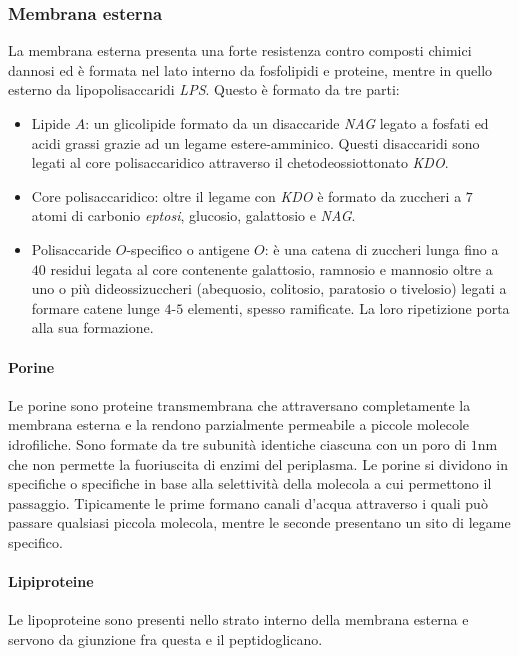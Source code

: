 \subsubsection{Membrana esterna}
La membrana esterna presenta una forte resistenza contro composti chimici dannosi ed \`e formata nel lato interno da fosfolipidi e proteine, mentre in quello esterno da lipopolisaccaridi
\emph{LPS}. Questo \`e formato da tre parti:
\begin{itemize}
	\item Lipide $A$: un glicolipide formato da un disaccaride \emph{NAG} legato a fosfati ed acidi grassi grazie ad un legame estere-amminico. Questi disaccaridi sono legati al core
		polisaccaridico attraverso il chetodeossiottonato \emph{KDO}.
	\item Core polisaccaridico: oltre il legame con \emph{KDO} \`e formato da zuccheri a $7$ atomi di carbonio \emph{eptosi}, glucosio, galattosio e \emph{NAG}. 
	\item Polisaccaride $O$-specifico o antigene $O$: \`e una catena di zuccheri lunga fino a $40$ residui legata al core contenente galattosio, ramnosio e mannosio oltre a uno 
		o pi\`u dideossizuccheri (abequosio, colitosio, paratosio o tivelosio) legati a formare catene lunge $4$-$5$ elementi, spesso ramificate. La loro ripetizione porta alla
		sua formazione. 
\end{itemize}
\paragraph{Porine}
Le porine sono proteine transmembrana che attraversano completamente la membrana esterna e la rendono parzialmente permeabile a piccole molecole idrofiliche. Sono formate da tre 
subunit\`a identiche ciascuna con un poro di $1\si{\nano\metre}$ che non permette la fuoriuscita di enzimi del periplasma. Le porine si dividono in specifiche o specifiche in base
alla selettivit\`a della molecola a cui permettono il passaggio. Tipicamente le prime formano canali d'acqua attraverso i quali pu\`o passare qualsiasi piccola molecola, mentre le
seconde presentano un sito di legame specifico. 
\paragraph{Lipiproteine}
Le lipoproteine sono presenti nello strato interno della membrana esterna e servono da giunzione fra questa e il peptidoglicano.
